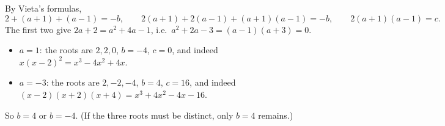 By Vieta's formulas,
\[
2+(a+1)+(a-1)=-b,\qquad 2(a+1)+2(a-1)+(a+1)(a-1)=-b,\qquad 2(a+1)(a-1)=c .
\]
The first two give $2a+2=a^2+4a-1$, i.e.\ $a^2+2a-3=(a-1)(a+3)=0$.

\begin{itemize}
\item $a=1$: the roots are $2,2,0$, $b=-4$, $c=0$, and indeed $x(x-2)^2=x^3-4x^2+4x$.
\item $a=-3$: the roots are $2,-2,-4$, $b=4$, $c=16$, and indeed $(x-2)(x+2)(x+4)=x^3+4x^2-4x-16$.
\end{itemize}
So $\boxed{b=4\text{ or }b=-4}$. (If the three roots must be distinct, only $b=4$ remains.)
